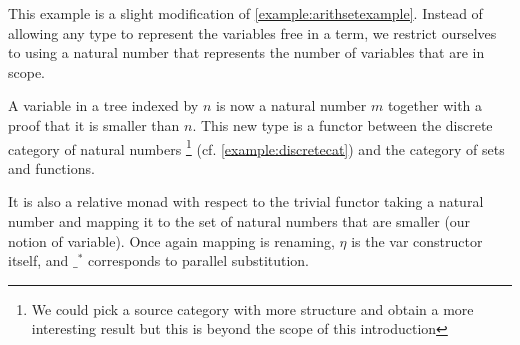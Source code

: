\begin{example}
\label{example:arithnatexample}

This example is a slight modification of \cref{example:arithsetexample}.
Instead of allowing any type to represent the variables free in a term,
we restrict ourselves to using a natural number that represents the number
of variables that are in scope.

A variable in a tree indexed by $n$ is now a natural number $m$ together
with a proof that it is smaller than $n$. This new type is a functor between
the discrete category of natural numbers%
\footnote{We could pick a source category with more structure and
obtain a more interesting result but this is beyond the scope of this
introduction}%
(cf. \cref{example:discretecat}) and the category of sets and functions.

It is also a relative monad with respect to the trivial functor taking
a natural number and mapping it to the set of natural numbers that are
smaller (our notion of variable). Once again mapping is renaming, $η$
is the var constructor itself, and $\_^*$ corresponds to parallel
substitution.
\end{example}
